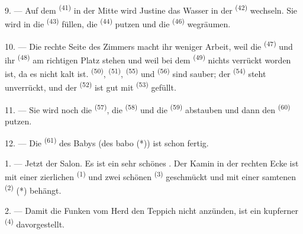 9. --- Auf dem  \textsuperscript{(41)} in der Mitte wird Justine das
Wasser in der  \textsuperscript{(42)} wechseln. Sie wird
 in die  \textsuperscript{(43)} füllen, die
 \textsuperscript{(44)} putzen und die 
\textsuperscript{(46)} wegräumen.

10. --- Die rechte Seite des Zimmers macht ihr weniger Arbeit, weil die
 \textsuperscript{(47)} und ihr 
\textsuperscript{(48)} am richtigen Platz stehen und weil bei dem 
\textsuperscript{(49)} nichts verrückt worden ist, da es nicht kalt ist.
 \textsuperscript{(50)},  \textsuperscript{(51)},
 \textsuperscript{(55)} und 
\textsuperscript{(56)} sind sauber; der  \textsuperscript{(54)}
steht unverrückt, und der  \textsuperscript{(52)} ist gut mit
 \textsuperscript{(53)} gefüllt.



11. --- Sie wird noch die  \textsuperscript{(57)}, die
 \textsuperscript{(58)} und die 
\textsuperscript{(59)} abstauben und dann den  \textsuperscript{(60)}
putzen.

12. --- Die  \textsuperscript{(61)} des Babys (des babo (*)) ist schon
fertig.

\VUsaut{5.0mm}
\VUsaut{3.0mm}

1. --- Jetzt der Salon. Es ist ein sehr schönes . Der Kamin in der
rechten Ecke ist mit einer zierlichen  \textsuperscript{(1)} und
zwei schönen  \textsuperscript{(3)} geschmückt und mit einer samtenen
 \textsuperscript{(2)} (*) behängt.

2. --- Damit die Funken vom Herd den Teppich nicht anzünden, ist ein kupferner
 \textsuperscript{(4)} davorgestellt.

